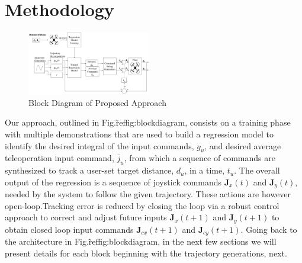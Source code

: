 \documentclass[letterpaper, 10 pt, conference]{ieeeconf}  %
\newcommand\NB[1]{$\spadesuit$\footnote{NB: #1}}
\begin{document}
\section{Methodology} \label{sec:approach}

\begin{figure}[ht]
    \includegraphics[width=0.48\textwidth]{images/blocks.PNG}
    \caption{Block Diagram of Proposed Approach}
    \label{fig:blockdiagram}
\end{figure}

Our approach, outlined in Fig.\~ref{fig:blockdiagram}, consists on a training phase with multiple demonstrations that are used to build a regression model to identify the desired integral of the input commands, $g_u$, and desired average teleoperation input command, $\bar{j}_u$, from which a sequence of commands are synthesized to track a user-set target distance, $d_u$, in a time, $t_u$. The overall output of the regression is a sequence of joystick commands $\mathbf{J}_x(t)$ and $\mathbf{J}_y(t)$, needed by the system to follow the given trajectory. These actions are however open-loop.Tracking error is reduced by closing the loop via a robust control approach to correct and adjust future inputs $\mathbf{J}_x(t+1)$ and $\mathbf{J}_y(t+1)$ to obtain closed loop input commands $\mathbf{J}_{cx}(t+1)$ and $\mathbf{J}_{cy}(t+1)$. 
Going back to the architecture in Fig.\~ref{fig:blockdiagram}, in the next few sections we will present details for each block beginning with the trajectory generations, next.
%
 
\end{document}
